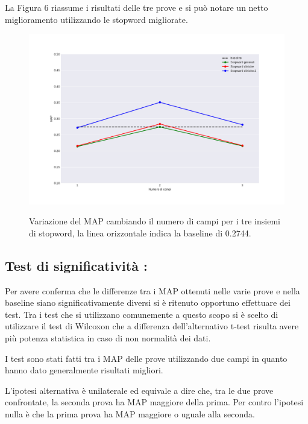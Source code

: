 \documentclass[runningheads]{llncs}
\begin{document}
La Figura 6 riassume i risultati delle tre prove e si pu\`o notare un netto miglioramento utilizzando le stopword migliorate.


\begin{figure}%
    \centering
    {{\includegraphics[width=0.8\linewidth]{maps} }}%
    \caption{Variazione del MAP cambiando il numero di campi per i tre insiemi di stopword, la linea orizzontale indica la baseline di 0.2744.}%
\end{figure}


\subsection{Test di significativit\`a :}
Per avere conferma che le differenze tra i MAP ottenuti nelle varie prove e nella baseline
siano significativamente diversi si \`e ritenuto opportuno effettuare dei test.
Tra i test che si utilizzano comunemente a questo scopo si \`e scelto di utilizzare il
test di Wilcoxon che a differenza dell'alternativo t-test risulta avere pi\`u
potenza statistica in caso di non normalit\`a dei dati.

I test sono stati fatti tra i MAP delle prove utilizzando due campi in quanto hanno
dato generalmente risultati migliori.

L'ipotesi alternativa \`e unilaterale ed equivale a dire che, tra le due prove
confrontate, la seconda prova ha MAP maggiore della prima.
Per contro l'ipotesi nulla \`e che la prima prova ha MAP maggiore o uguale alla seconda.
\end{document}
